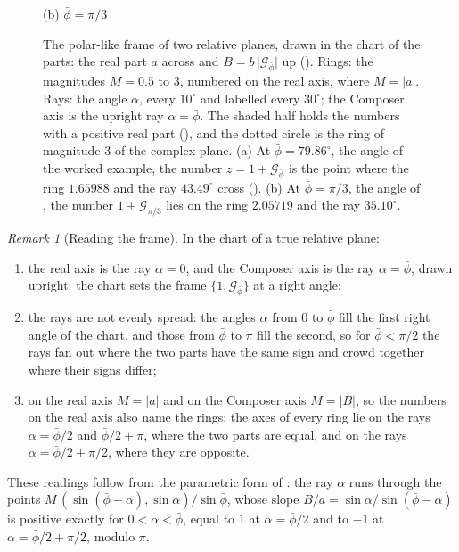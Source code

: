 \documentclass[11pt,a4paper]{amsart}
\theoremstyle{plain}
\theoremstyle{definition}
\theoremstyle{remark}
\newtheorem{remark}[theorem]{Remark}
\newcommand{\pb}{\bar{\phi}}                     %
\newcommand{\Gp}{\mathcal{G}_{\bar{\phi}}}       %
\begin{document}
\begin{figure}[tb]
\begin{minipage}[b]{0.49\textwidth}
\smallskip
{\small (b) $\pb = \pi/3$\par}
\end{minipage}
\caption{The polar-like frame of two relative planes, drawn in the chart of the parts: the real part $a$ across and $B = b\,\lvert\Gp\rvert$ up (). Rings: the magnitudes $M = 0.5$ to $3$, numbered on the real axis, where $M = \lvert a\rvert$. Rays: the angle $\alpha$, every $10^\circ$ and labelled every $30^\circ$; the Composer axis is the upright ray $\alpha = \pb$. The shaded half holds the numbers with a positive real part (), and the dotted circle is the ring of magnitude $3$ of the complex plane. (a) At $\pb = 79.86^\circ$, the angle of the worked example, the number $z = 1 + \Gp$ is the point where the ring $1.65988$ and the ray $43.49^\circ$ cross (). (b) At $\pb = \pi/3$, the angle of , the number $1 + \mathcal{G}_{\pi/3}$ lies on the ring $2.05719$ and the ray $35.10^\circ$.}
\label{fig:polar-frame}
\end{figure}

\begin{remark}[Reading the frame]\label{rem:frame-readings}
In the chart of a true relative plane:
\begin{enumerate}
  \item the real axis is the ray $\alpha = 0$, and the Composer axis is the ray $\alpha = \pb$, drawn upright: the chart sets the frame $\{1, \Gp\}$ at a right angle;
  \item the rays are not evenly spread: the angles $\alpha$ from $0$ to $\pb$ fill the first right angle of the chart, and those from $\pb$ to $\pi$ fill the second, so for $\pb < \pi/2$ the rays fan out where the two parts have the same sign and crowd together where their signs differ;
  \item on the real axis $M = \lvert a\rvert$ and on the Composer axis $M = \lvert B\rvert$, so the numbers on the real axis also name the rings; the axes of every ring lie on the rays $\alpha = \pb/2$ and $\pb/2 + \pi$, where the two parts are equal, and on the rays $\alpha = \pb/2 \pm \pi/2$, where they are opposite.
\end{enumerate}
These readings follow from the parametric form of : the ray $\alpha$ runs through the points $M\,(\sin(\pb - \alpha), \sin\alpha)/\sin\pb$, whose slope $B/a = \sin\alpha/\sin(\pb - \alpha)$ is positive exactly for $0 < \alpha < \pb$, equal to $1$ at $\alpha = \pb/2$ and to $-1$ at $\alpha = \pb/2 + \pi/2$, modulo $\pi$.
\end{remark}
\end{document}
